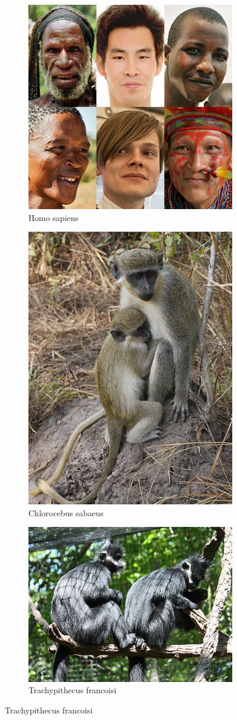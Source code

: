 \documentclass[a4paper, 12pt, one column]{article}
\begin{document}
\begin{figure}[H]
    \begin{subfigure}{.3\textwidth}
        \centering
        \includegraphics[width=.4\linewidth]{Homo sapiens.jpeg}
        \caption{Homo sapiens}
        \label{fig:Homo sapiens}
    \end{subfigure}
    \begin{subfigure}{.3\textwidth}
        \centering
        \includegraphics[width=.4\linewidth]{Chlorocebus sabaeus.jpeg}
        \caption{Chlorocebus sabaeus}
        \label{fig:Chlorocebus sabaeus}
    \end{subfigure}
    \begin{subfigure}{.3\textwidth}
        \centering
        \includegraphics[width=.4\linewidth]{Trachypithecus francoisi.jpeg}
        \caption{Trachypithecus francoisi}
        \label{fig:Trachypithecus francoisi}
    \end{subfigure}

\end{figure}
\end{document}
